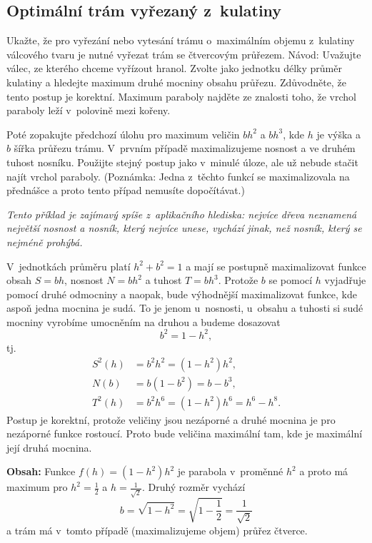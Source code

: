 \konec



\stranka

\subsection{Optimální trám vyřezaný z kulatiny}
Ukažte, že pro vyřezání nebo vytesání trámu o maximálním objemu z kulatiny válcového tvaru je nutné vyřezat trám se čtvercovým
průřezem. Návod: Uvažujte válec, ze kterého chceme vyřízout
hranol. Zvolte jako jednotku délky průměr kulatiny a hledejte maximum
druhé mocniny obsahu průřezu. Zdůvodněte, že tento postup je
korektní. Maximum paraboly najděte ze znalosti toho, že vrchol
paraboly leží v polovině mezi kořeny.

Poté zopakujte předchozí úlohu pro maximum veličin $bh^2$ a $bh^3$, kde $h$
je výška a $b$ šířka průřezu trámu. V prvním případě maximalizujeme
nosnost a ve druhém tuhost nosníku. Použijte stejný postup jako v minulé úloze, ale už nebude stačit najít vrchol paraboly. (Poznámka: Jedna z těchto funkcí se maximalizovala na přednášce a proto tento případ nemusíte dopočítávat.)

\textit{Tento příklad je zajímavý spíše z aplikačního hlediska: nejvíce dřeva neznamená největší nosnost a nosník, který nejvíce unese, vychází jinak, než nosník, který se nejméně prohýbá.}

\reseni

V jednotkách průměru platí $h^2+b^2=1$
a mají se postupně maximalizovat funkce obsah $S=bh$, nosnost $N=bh^2$ a tuhost $T=bh^3$. Protože $b$ se pomocí $h$ vyjadřuje pomocí druhé odmocniny a naopak, bude výhodnější maximalizovat funkce, kde aspoň jedna mocnina je sudá. To je jenom u nosnosti, u obsahu a tuhosti si sudé mocniny vyrobíme umocněním na druhou a budeme dosazovat $$b^2=1-h^2,$$ tj.
$$
\begin{aligned}
S^2(h)&=b^2h^2=(1-h^2)h^2,\\
N(b)&=b(1-b^2)=b-b^3,\\
T^2(h)&=b^2h^6=(1-h^2)h^6=h^6-h^8.
\end{aligned}
$$
Postup je korektní, protože veličiny jsou nezáporné a druhé mocnina je pro nezáporné funkce rostoucí. Proto bude veličina maximální tam, kde je maximální její druhá mocnina.

\textbf{Obsah: }Funkce $f(h)=(1-h^2)h^2$ je parabola v proměnné $h^2$ a proto má maximum pro $h^2=\frac 12$ a $h=\frac {1}{\sqrt 2}$. Druhý rozměr vychází
$$b=\sqrt{1-h^2}=\sqrt{1-\frac 12}=\frac{1}{\sqrt 2}$$ a trám má v tomto případě (maximalizujeme objem) průřez čtverce.

